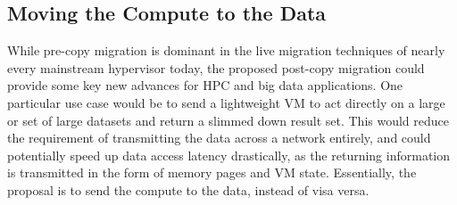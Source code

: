 

%
%







\subsection{Moving the Compute to the Data}


While pre-copy migration is dominant in the live migration techniques of nearly every mainstream hypervisor today, the proposed post-copy migration could provide some key new advances for HPC and big data applications. One particular use case would be to send a lightweight VM to act directly on a large or set of large datasets and return a slimmed down result set. This would reduce the requirement of transmitting the data across a network entirely, and could potentially speed up data access latency drastically, as the returning information is transmitted in the form of memory pages and VM state. Essentially, the proposal is to send the compute to the data, instead of visa versa.  

